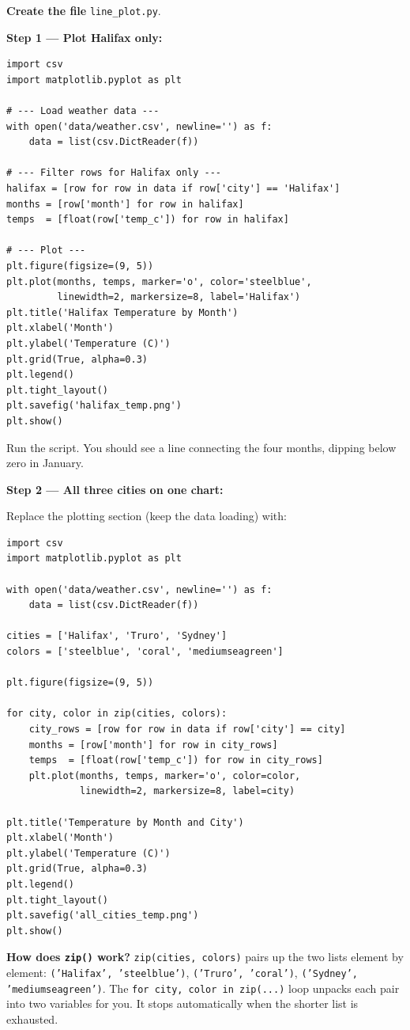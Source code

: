 \documentclass{cslab}
\begin{document}
\textbf{Create the file} \texttt{line\_plot.py}.

\textbf{Step 1 --- Plot Halifax only:}

\begin{lstlisting}
import csv
import matplotlib.pyplot as plt

# --- Load weather data ---
with open('data/weather.csv', newline='') as f:
    data = list(csv.DictReader(f))

# --- Filter rows for Halifax only ---
halifax = [row for row in data if row['city'] == 'Halifax']
months = [row['month'] for row in halifax]
temps  = [float(row['temp_c']) for row in halifax]

# --- Plot ---
plt.figure(figsize=(9, 5))
plt.plot(months, temps, marker='o', color='steelblue',
         linewidth=2, markersize=8, label='Halifax')
plt.title('Halifax Temperature by Month')
plt.xlabel('Month')
plt.ylabel('Temperature (C)')
plt.grid(True, alpha=0.3)
plt.legend()
plt.tight_layout()
plt.savefig('halifax_temp.png')
plt.show()
\end{lstlisting}

Run the script. You should see a line connecting the four months, dipping below zero in January.

\textbf{Step 2 --- All three cities on one chart:}

Replace the plotting section (keep the data loading) with:

\begin{lstlisting}
import csv
import matplotlib.pyplot as plt

with open('data/weather.csv', newline='') as f:
    data = list(csv.DictReader(f))

cities = ['Halifax', 'Truro', 'Sydney']
colors = ['steelblue', 'coral', 'mediumseagreen']

plt.figure(figsize=(9, 5))

for city, color in zip(cities, colors):
    city_rows = [row for row in data if row['city'] == city]
    months = [row['month'] for row in city_rows]
    temps  = [float(row['temp_c']) for row in city_rows]
    plt.plot(months, temps, marker='o', color=color,
             linewidth=2, markersize=8, label=city)

plt.title('Temperature by Month and City')
plt.xlabel('Month')
plt.ylabel('Temperature (C)')
plt.grid(True, alpha=0.3)
plt.legend()
plt.tight_layout()
plt.savefig('all_cities_temp.png')
plt.show()
\end{lstlisting}

\begin{hint}
\textbf{How does \texttt{zip()} work?} \texttt{zip(cities, colors)} pairs up the two lists element by element: \texttt{('Halifax', 'steelblue')}, \texttt{('Truro', 'coral')}, \texttt{('Sydney', 'mediumseagreen')}. The \texttt{for city, color in zip(...)} loop unpacks each pair into two variables for you. It stops automatically when the shorter list is exhausted.
\end{hint}
\end{document}
